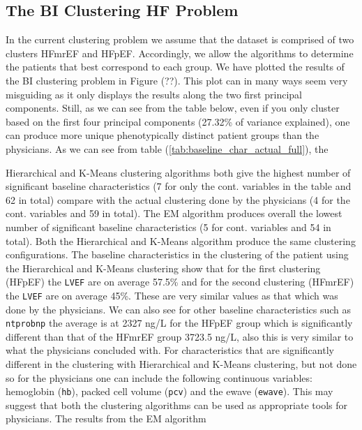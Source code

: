 \documentclass[../thesis.tex]{subfiles}
\begin{document}
\subsection{The BI Clustering HF Problem}
\label{subsec:bi_clust}

In the current clustering problem we assume that the dataset is comprised of two clusters HFmrEF and HFpEF. Accordingly, we allow the algorithms to determine the patients that best correspond to each group. We have plotted the results of the BI clustering problem in Figure (??). This plot can in many ways seem very misguiding as it only displays the results along the two first principal components. Still, as we can see from the table below, even if you only cluster based on the first four principal components (27.32\% of variance explained), one can produce more unique phenotypically distinct patient groups than the physicians. As we can see from table (\ref{tab:baseline_char_actual_full}), the 





\noindent Hierarchical and K-Means clustering algorithms both give the highest number of significant
baseline characteristics (7 for only the cont. variables in the table and 62 in total) compare with the actual clustering done by the physicians (4 for the cont. variables and 59 in total). The EM algorithm produces overall the lowest number of significant baseline characteristics (5 for cont. variables and 54 in total). Both the Hierarchical and K-Means algorithm produce the same clustering configurations. The baseline characteristics in the clustering of the patient using the Hierarchical and K-Means clustering show that for the first clustering (HFpEF) the \texttt{LVEF} are on average 57.5\% and
for the second clustering (HFmrEF) the \texttt{LVEF} are on average 45\%. These are very similar values as that which was done by the physicians. We can also see for other baseline characteristics such as \texttt{ntprobnp} the average is at 2327 ng/L for the HFpEF group which is significantly different than that of the HFmrEF group 3723.5 ng/L, also this is very similar to what the physicians concluded with. For characteristics that are significantly different in the clustering with Hierarchical and K-Means clustering, but not done so for the physicians one can include the following continuous variables: hemoglobin (\texttt{hb}), packed cell volume (\texttt{pcv}) and the ewave (\texttt{ewave}). This may suggest that both the clustering algorithms can be used as appropriate tools for physicians. The results from the EM algorithm 
\end{document}
